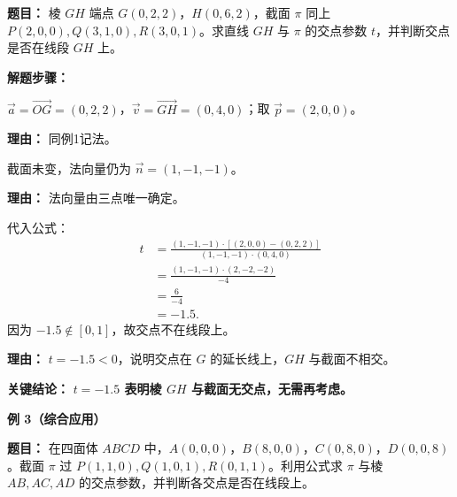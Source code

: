 \begin{examplebox}
	\medskip
	\textbf{\textcolor{CExample}{题目：}}
	棱 $GH$ 端点 $G(0,2,2)$，$H(0,6,2)$，截面 $\pi$ 同上 $P(2,0,0),Q(3,1,0),R(3,0,1)$。求直线 $GH$ 与 $\pi$ 的交点参数 $t$，并判断交点是否在线段 $GH$ 上。

	\medskip
	\textbf{\textcolor{CExample}{解题步骤：}}
	\begin{description}[style=nextline, leftmargin=2.8em, labelsep=0.5em, itemsep=0.45em]
		\item[\textbf{第一步（参数设定）：}]
			$\vec{a}=\overrightarrow{OG}=(0,2,2)$，$\vec{v}=\overrightarrow{GH}=(0,4,0)$；取 $\vec{p}=(2,0,0)$。
			\par\textbf{理由：} 同例1记法。
		\item[\textbf{第二步（法向量沿用）：}]
			截面未变，法向量仍为 $\vec{n}=(1,-1,-1)$。
			\par\textbf{理由：} 法向量由三点唯一确定。
		\item[\textbf{第三步（代入公式与判断）：}]
			代入公式：
			\[
				\begin{aligned}
					t &= \frac{(1,-1,-1)\cdot[(2,0,0)-(0,2,2)]}{(1,-1,-1)\cdot(0,4,0)} \\ &= \frac{(1,-1,-1)\cdot(2,-2,-2)}{-4} \\ &= \frac{6}{-4} \\ &= -1.5.
			\end{aligned}
			\]
			因为 $-1.5 \notin [0,1]$，故交点不在线段上。
			\par\textbf{理由：} $t=-1.5<0$，说明交点在 $G$ 的延长线上，$GH$ 与截面不相交。
	\end{description}

	\medskip
	\textbf{\textcolor{CExample}{关键结论：}}
	\textbf{$t=-1.5$ 表明棱 $GH$ 与截面无交点，无需再考虑。}

	\medskip
	\textbf{\textcolor{CExample}{例 3（综合应用）}}

	\medskip
	\textbf{\textcolor{CExample}{题目：}}
	在四面体 $ABCD$ 中，$A(0,0,0)$，$B(8,0,0)$，$C(0,8,0)$，$D(0,0,8)$。截面 $\pi$ 过 $P(1,1,0),Q(1,0,1),R(0,1,1)$。利用公式求 $\pi$ 与棱 $AB, AC, AD$ 的交点参数，并判断各交点是否在线段上。


\end{examplebox}
